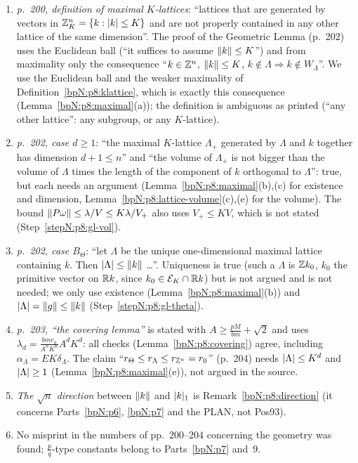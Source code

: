 \begin{remark}\label{bpN:p8:errata}
\begin{enumerate}[label=(\arabic*)]
\item \emph{p.~200, definition of maximal $K$-lattices}: ``lattices that are generated by vectors in $\mathbb{Z}^n_K=\{k:\lvert k\rvert\le K\}$ and are not properly contained in any other lattice of the same dimension''. The proof of the Geometric Lemma (p.~202) uses the Euclidean ball (``it suffices to assume $\lVert k\rVert\le K$'') and from maximality only the consequence ``$k\in\mathbb{Z}^n$, $\lVert k\rVert\le K$, $k\notin\Lambda\Rightarrow k\notin W_\Lambda$''. We use the Euclidean ball and the weaker maximality of Definition~\ref{bpN:p8:klattice}, which is exactly this consequence (Lemma~\ref{bpN:p8:maximal}(a)); the definition is ambiguous as printed (``any other lattice'': any subgroup, or any $K$-lattice).
\item \emph{p.~202, case $d\ge1$}: ``the maximal $K$-lattice $\Lambda_+$ generated by $\Lambda$ and $k$ together has dimension $d+1\le n$'' and ``the volume of $\Lambda_+$ is not bigger than the volume of $\Lambda$ times the length of the component of $k$ orthogonal to $\Lambda$'': true, but each needs an argument (Lemma~\ref{bpN:p8:maximal}(b),(c) for existence and dimension, Lemma~\ref{bpN:p8:lattice-volume}(c),(e) for the volume). The bound $\lVert P\omega\rVert\le\lambda/V\le K\lambda/V_+$ also uses $V_+\le KV$, which is not stated (Step~\ref{stepN:p8:gl-vol}).
\item \emph{p.~202, case $B_\Theta$}: ``let $\Lambda$ be the unique one-dimensional maximal lattice containing $k$. Then $\lvert \Lambda\rvert\le\lVert k\rVert$ \dots''. Uniqueness is true (such a $\Lambda$ is $\mathbb{Z} k_0$, $k_0$ the primitive vector on $\mathbb{R} k$, since $k_0\in\mathcal E_K\cap\mathbb{R} k$) but is not argued and is not needed; we only use existence (Lemma~\ref{bpN:p8:maximal}(b)) and $\lvert \Lambda\rvert=\lVert g\rVert\le\lVert k\rVert$ (Step~\ref{stepN:p8:gl-theta}).
\item \emph{p.~203, ``the covering lemma''} is stated with $A\ge\frac{pM}{bm}+\sqrt2$ and uses $\lambda_d=\frac{bmr_0}{A^nK^n}A^dK^d$: all checks (Lemma~\ref{bpN:p8:covering}) agree, including $\alpha_\Lambda=EK\delta_\Lambda$. The claim ``$r_\Theta\le r_\Lambda\le r_{\mathbb{Z}^n}=r_0$'' (p.~204) needs $\lvert \Lambda\rvert\le K^d$ and $\lvert \Lambda\rvert\ge1$ (Lemma~\ref{bpN:p8:maximal}(e)), not argued in the source.
\item \emph{The $\sqrt n$ direction} between $\lVert k\rVert$ and $\lvert k\rvert_1$ is Remark~\ref{bpN:p8:direction} (it concerns Parts~\ref{bpN:p6}, \ref{bpN:p7} and the PLAN, not Pos93).
\item No misprint in the numbers of pp.~200--204 concerning the geometry was found; $\frac pq$-type constants belong to Parts~\ref{bpN:p7} and~9.
\end{enumerate}
\end{remark}

